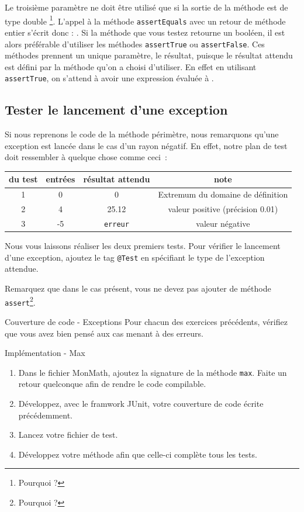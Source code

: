 \documentclass[a4paper,11pt]{article}
\begin{document}
	Le troisième paramètre ne doit être utilisé que si la sortie de la méthode est de type double \footnote{Pourquoi ?}.
	L’appel à la méthode \texttt{assertEquals} avec un retour de méthode entier s’écrit donc :
	.
	Si la méthode que vous testez retourne un booléen, il est alors préférable d’utiliser les méthodes \texttt{assertTrue} ou \texttt{assertFalse}. Ces méthodes prennent un unique paramètre, le résultat, puisque le résultat attendu est défini par la méthode qu'on a choisi d'utiliser. En effet en utilisant \texttt{assertTrue}, on s’attend à avoir une expression évaluée à .

	\subsection{Tester le lancement d'une exception}
	Si nous reprenons le code de la méthode périmètre, nous remarquons qu'une exception est lancée dans le cas d'un rayon négatif. En effet, notre plan de test doit ressembler à quelque chose comme ceci~:

	\begin{center}
		\begin{tabular}{|c|c|c|c|}
			\hline
			\no du test & entrées & résultat attendu & note \\
			\hline
			1 & 0 & 0 & Extremum du domaine de définition \\
			\hline
			2 & 4 & 25.12 & valeur positive (précision 0.01) \\
			\hline
			3 & -5 & \texttt{erreur} & valeur négative \\
			\hline
		\end{tabular}
	\end{center}

	Nous vous laissons réaliser les deux premiers tests. Pour vérifier le lancement d'une exception, ajoutez le tag \texttt{@Test} en spécifiant le type de l'exception attendue.

	Remarquez que dans le cas présent, vous ne devez pas ajouter de méthode \texttt{assert}\footnote{Pourquoi ?}.

	\begin{Exercice}{Couverture de code - Exceptions}
		Pour chacun des exercices précédents, vérifiez que vous avez bien pensé aux cas menant à des erreurs.
	\end{Exercice}

	\begin{Exercice}{Implémentation - Max}
		\begin{enumerate}
			\item Dans le fichier MonMath, ajoutez la signature de la méthode \texttt{max}. Faite un retour quelconque afin de rendre le code compilable.
			\item Développez, avec le framwork JUnit, votre couverture de code écrite précédemment.
			\item Lancez votre fichier de test.
			\item Développez votre méthode afin que celle-ci complète tous les tests.
		\end{enumerate}
	\end{Exercice}
\end{document}
